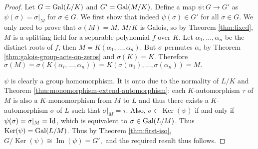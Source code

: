 \begin{proof}
	Let $G = \operatorname{Gal}(L/K)$ and $G' = \operatorname{Gal}(M/K)$. Define a map $\psi: G \to G'$ as $\psi(\sigma) = \sigma | _M$ for $\sigma \in G$. We first show that indeed $\psi(\sigma) \in G'$ for all $\sigma \in G$. We only need to prove that $\sigma(M) = M$. $M/K$ is Galois, so by Theorem \ref{thm:fixed}, $M$ is a splitting field for a separable polynomial $f$ over $K$. Let $\alpha_1, \dots, \alpha_n$ be the distinct roots of $f$, then $M = K(\alpha_1, \ldots, \alpha_n)$. But $\sigma$ permutes $\alpha_i$ by Theorem \ref{thm:galois-group-acts-on-zeros} and $\sigma(K) = K$. Therefore $\sigma(M) = \sigma(K(\alpha_i, \ldots, \alpha_n)) = K(\sigma(\alpha_1), \ldots, \sigma(\alpha_n)) = M. $
	
	
	 $\psi$ is clearly a group homomorphism. It is onto due to the normality of $L/K$ and Theorem \ref{thm:monomorphism-extend-automorphism}: each $K$-automorphism $\tau$ of $M$ is also a $K$-monomorphism from $M$ to $L$ and thus there exists a $K$-automorphism $\sigma$ of $L$ such that $\sigma | _M = \tau$. Also, $\sigma \in \operatorname{Ker}(\psi)$ if and only if $\psi(\sigma) = \sigma |_M = \operatorname{Id}$, which is equivalent to $\sigma \in \operatorname{Gal}(L/M)$. Thus $\operatorname{Ker}(\psi) = \operatorname{Gal}(L/M)$. Thus by Theorem \ref{thm:first-iso}, 
	$G / \operatorname{Ker}(\psi) \cong \operatorname{Im}(\psi) = G',$
	and the required result thus follows. 
\end{proof}


%	
%    
%    
%


